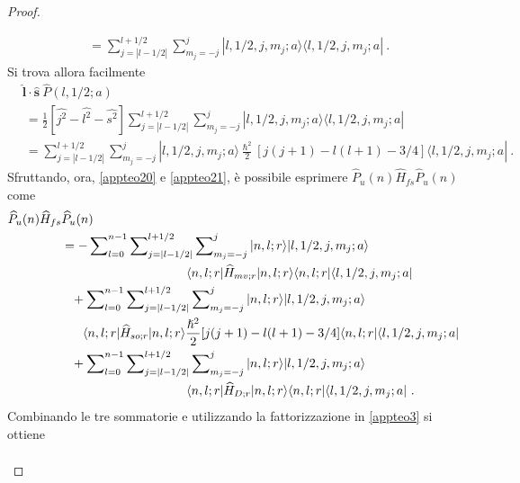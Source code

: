 \documentclass[12pt,a4paper]{report}
\numberwithin{equation}{section}
\numberwithin{section}{chapter}
\begin{document}
\begin{proof}
\begin{enumerate}[leftmargin=0pt, itemindent=2.67\parindent]
\begin{align}
		&=\sum\nolimits_{j=|l-1/2|}^{l+1/2}\sum\nolimits_{m_j=-j}^j|l,1/2,j,m_j;a\rangle\langle l,1/2,j,m_j;a|~.\nonumber 
		\end{align}
		Si trova allora facilmente
		\begin{align}
		\label{appteo21}
		&\widehat{\boldsymbol{l}} \cdot \widehat{\boldsymbol{s}}~\widehat{P}(l,1/2;a)\\
		&~=\frac{1}{2}[\widehat{j^2} - \widehat{l^2} - \widehat{s^2}] \sum\nolimits_{j=|l-1/2|}^{l+1/2}\sum\nolimits_{m_j=-j}^j|l,1/2,j,m_j;a\rangle\langle l,1/2,j,m_j;a|\nonumber\\
		&~=\sum\nolimits_{j=|l-1/2|}^{l+1/2}\sum\nolimits_{m_j=-j}^j|l,1/2,j,m_j;a\rangle\frac{\hslash^2}{2}[j(j+1) - l(l+1) - 3/4]\langle l,1/2,j,m_j;a|~.\nonumber
		\end{align}
		Sfruttando, ora, \eqref{appteo20} e \eqref{appteo21}, \`e possibile esprimere $\widehat{P}_u(n)\widehat{H}_{fs}\widehat{P}_u(n)$ come
		\begin{align}
		\label{appteo22}
		&\widehat{P}_u(n)\widehat{H}_{fs}\widehat{P}_u(n)\\
		&\hspace{1.5cm}=-\sum\nolimits_{l=0}^{n-1}\sum\nolimits_{j=|l-1/2|}^{l+1/2}\sum\nolimits_{m_j=-j}^j|n,l;r\rangle|l,1/2,j,m_j;a\rangle\nonumber\\
		&\hspace{5cm}\langle n,l;r|\widehat{H}_{mv;r}|n,l;r\rangle\langle n,l;r|\langle l,1/2,j,m_j;a|\nonumber\\
		&\hspace{1.5cm}\hphantom{=} +\sum\nolimits_{l=0}^{n-1}\sum\nolimits_{j=|l-1/2|}^{l+1/2}\sum\nolimits_{m_j=-j}^j|n,l;r\rangle|l,1/2,j,m_j;a\rangle\nonumber\\
		&\hspace{2.1cm}\langle n,l;r|\widehat{H}_{so;r}|n,l;r\rangle\frac{\hslash^2}{2}[j(j+1) - l(l+1) - 3/4]\langle n,l;r|\langle l,1/2,j,m_j;a|\nonumber\\
		&\hspace{1.5cm}\hphantom{=} +\sum\nolimits_{l=0}^{n-1}\sum\nolimits_{j=|l-1/2|}^{l+1/2}\sum\nolimits_{m_j=-j}^j|n,l;r\rangle|l,1/2,j,m_j;a\rangle\nonumber\\
		&\hspace{5cm}\langle n,l;r|\widehat{H}_{D;r}|n,l;r\rangle\langle n,l;r|\langle l,1/2,j,m_j;a|~.\nonumber
		\end{align}
		Combinando le tre sommatorie e utilizzando la fattorizzazione in \eqref{appteo3} si ottiene
		\begin{align}

\end{align}
\end{enumerate}
\end{proof}
\end{document}
